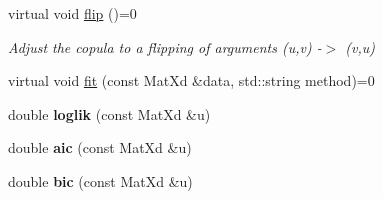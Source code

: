\begin{DoxyCompactItemize}
\item 
\hypertarget{class_bicop_ac7d72dc620a2de66f6c1136329d1b4a3}{virtual void \hyperlink{class_bicop_ac7d72dc620a2de66f6c1136329d1b4a3}{flip} ()=0}\label{class_bicop_ac7d72dc620a2de66f6c1136329d1b4a3}

\begin{DoxyCompactList}\small\item\em Adjust the copula to a flipping of arguments (u,v) -\/$>$ (v,u) \end{DoxyCompactList}\end{DoxyCompactItemize}
{\bf }\par
\begin{DoxyCompactItemize}
\item 
virtual void \hyperlink{class_bicop_a0ff40d8054e11ed8aaa4956c7fd84e89}{fit} (const Mat\+Xd \&data, std\+::string method)=0
\item 
\hypertarget{class_bicop_a994d28aa99b881425f012605aef3ae68}{double {\bfseries loglik} (const Mat\+Xd \&u)}\label{class_bicop_a994d28aa99b881425f012605aef3ae68}

\item 
\hypertarget{class_bicop_adb4aecd877fc32cc857e2477d5bddf9b}{double {\bfseries aic} (const Mat\+Xd \&u)}\label{class_bicop_adb4aecd877fc32cc857e2477d5bddf9b}

\item 
\hypertarget{class_bicop_a68ee43f29c026aaf8157673c1ddf29b2}{double {\bfseries bic} (const Mat\+Xd \&u)}\label{class_bicop_a68ee43f29c026aaf8157673c1ddf29b2}

\end{DoxyCompactItemize}

